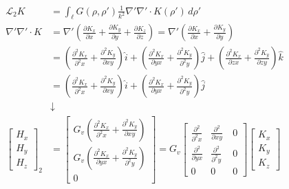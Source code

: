 \documentclass{article}
\newcommand{\0}{\varnothing}
\begin{document}
\begin{align*}
    \\
    \mathcal{L}_2 K &= \int_{\ell}G(\rho,\rho')\frac{1}{k^2}\nabla'\nabla'\cdotp K(\rho') \,d\rho'\\
    \nabla'\nabla'\cdotp K &= \nabla' (\frac{\partial K_x}{\partial x} + \frac{\partial K_y}{\partial y} + \frac{\partial K_z}{\partial z}) 
    = \nabla' \left( \frac{\partial K_x}{\partial x} + \frac{\partial K_y}{\partial y} \right)\\
    &= \left( \frac{\partial^2 K_x}{\partial^2 x} + \frac{\partial^2 K_y}{\partial xy}\right) \hat i + 
    \left( \frac{\partial^2 K_x}{\partial yx} + \frac{\partial^2 K_y}{\partial^2 y}\right) \hat j + 
        \left( \frac{\partial^2 K_x}{\partial zx} + \frac{\partial^2 K_y}{\partial zy}\right) \hat k\\
    &=  \left( \frac{\partial^2 K_x}{\partial^2 x} + \frac{\partial^2 K_y}{\partial xy}\right) \hat i + 
    \left( \frac{\partial^2 K_x}{\partial yx} + \frac{\partial^2 K_y}{\partial^2 y}\right) \hat j \\
    &\downarrow \\
    \left[ \begin{array}{c} H_x \\ H_y \\ H_z \end{array} \right]_2 &= 
    \left[ \begin{array}{c} G_v\left( \frac{\partial^2 K_x}{\partial^2 x} + \frac{\partial^2 K_y}{\partial xy}\right) \\ 
                            G_v\left( \frac{\partial^2 K_x}{\partial yx} + \frac{\partial^2 K_y}{\partial^2 y}\right)\\ 
                            0 \end{array} \right] = 
    G_v \left[ \begin{array}{ccc} \frac{\partial^2 }{\partial^2 x} & \frac{\partial^2 }{\partial xy}\ & 0 \\ 
                            \frac{\partial^2 }{\partial yx} & \frac{\partial^2 }{\partial^2 y} &0\\ 
                            0 & 0 &0 \end{array} \right]
        \left[ \begin{array}{c} K_x \\ K_y \\ K_z \end{array} \right]\\
\end{align*}
\end{document}
